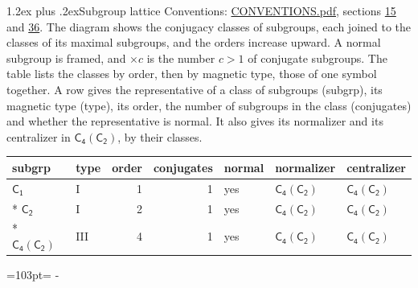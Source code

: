 \documentclass[10pt,a4paper]{article}
\makeatletter
\renewcommand\section{\@startsection{section}{1}{\z@}{-3ex plus -1ex minus -.2ex}%
  {1.2ex plus .2ex}{\normalfont\large\sffamily\bfseries\color{parttitle}}}
\newcommand{\needspace}[1]{\par\penalty-100\begingroup\dimen0=#1\relax\dimen2=\pagegoal
  \advance\dimen2-\pagetotal\ifdim\dimen0>\dimen2\relax\ifdim\dimen2>0pt\vfil\break\fi\fi
  \endgroup}
\numberwithin{equation}{section}
\newcommand{\grp}[1]{\mathsf{#1}}
\makeatother
\begin{document}
\section{Subgroup lattice}\label{s:subgroups}
Conventions: \href{../../CONVENTIONS.pdf}{CONVENTIONS.pdf}, sections \href{../../../rotation/CONVENTIONS.pdf\#conv.15}{15} and \href{../../CONVENTIONS.pdf\#conv.36}{36}.
The diagram shows the conjugacy classes of subgroups, each joined to the classes of its maximal subgroups, and the orders increase upward. \label{n:index.conjugates.c}A normal subgroup is framed, and ${\times}c$ is the number $c > 1$ of conjugate subgroups. The table lists the classes by order, then by magnetic type, those of one symbol together. \label{n:head.subgroup}\label{n:head.magnetic.type}\label{n:head.order}\label{n:head.conjugates}\label{n:head.normal}A row gives the representative of a class of subgroups (subgrp), its magnetic type (type), its order, the number of subgroups in the class (conjugates) and whether the representative is normal. \label{n:head.normalizer}\label{n:head.centralizer}It also gives its normalizer and its centralizer in $\grp{C_{4}}(\grp{C_{2}})$, by their classes. 
\begin{center}
\end{center}
{\small\begin{longtable}{@{}llrrlll@{}}\toprule
subgrp & type & order & conjugates & normal & normalizer & centralizer\\\midrule\endhead
\bottomrule\endfoot\endlastfoot
\href{../../../rotation/data/pdf/C1.pdf}{$\grp{C_{1}}$} & I & 1 & 1 & yes & \href{C4-C2.pdf}{$\grp{C_{4}}(\grp{C_{2}})$} & \href{C4-C2.pdf}{$\grp{C_{4}}(\grp{C_{2}})$}\\*
\href{../../../rotation/data/pdf/C2.pdf}{$\grp{C_{2}}$} & I & 2 & 1 & yes & \href{C4-C2.pdf}{$\grp{C_{4}}(\grp{C_{2}})$} & \href{C4-C2.pdf}{$\grp{C_{4}}(\grp{C_{2}})$}\\*
\href{C4-C2.pdf}{$\grp{C_{4}}(\grp{C_{2}})$} & III & 4 & 1 & yes & \href{C4-C2.pdf}{$\grp{C_{4}}(\grp{C_{2}})$} & \href{C4-C2.pdf}{$\grp{C_{4}}(\grp{C_{2}})$}\\
\bottomrule\end{longtable}}
\needspace{103pt}
\end{document}
